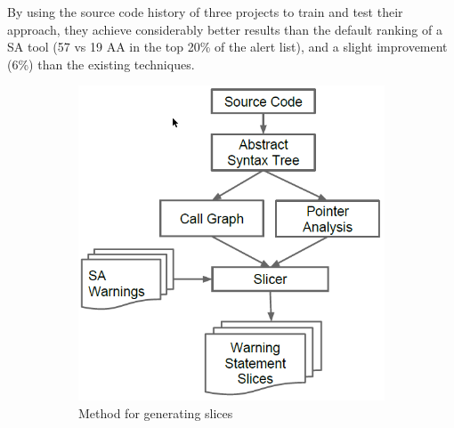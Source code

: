 \documentclass{article}
\begin{document}
 By using the source code history of three projects to train and test their approach, they achieve considerably better results than the default ranking of a SA tool (57 vs 19 AA in the top 20\% of the alert list), and a slight improvement (6\%) than the existing techniques.

 \begin{figure}[H]
     \begin{subfigure}{.5\textwidth}
         \centering
         \includegraphics[scale=0.3]{./src/alert_patterns_slicing.png}
         \caption{Method for generating slices}\label{alert_patterns:slicing}
     \end{subfigure}%
     \begin{subfigure}{.5\textwidth}
         \centering

\end{subfigure}
\end{figure}
\end{document}
